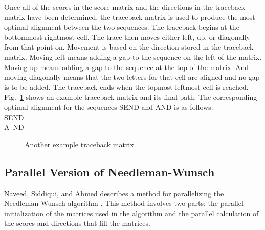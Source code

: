 \documentclass[conference]{IEEEtran}
\begin{document}
Once all of the scores in the score matrix and the directions in the traceback matrix have been determined, the traceback matrix is used to produce the most optimal alignment between the two sequences. The traceback begins at the bottommost rightmost cell. The trace then moves either left, up, or diagonally from that point on. Movement is based on the direction stored in the traceback matrix. Moving left means adding a gap to the sequence on the left of the matrix. Moving up means adding a gap to the sequence at the top of the matrix. And moving diagonally means that the two letters for that cell are aligned and no gap is to be added. The traceback ends when the topmost leftmost cell is reached. Fig.~\ref{7} shows an example traceback matrix and its final path. The corresponding optimal alignment for the sequences SEND and AND is as follows:\\
 
\hspace*{1em}SEND\\
\hspace*{2em}A–ND

\begin{figure}[htbp]
\centerline{}
\caption{Another example traceback matrix. \cite{vladimir}}
\label{7}
\end{figure}

\subsection{Parallel Version of Needleman-Wunsch}
Naveed, Siddiqui, and Ahmed describes a method for parallelizing the Needleman-Wunsch algorithm \cite{naveed_siddiqui_ahmed}. This method involves two parts: the parallel initialization of the matrices used in the algorithm and the parallel calculation of the scores and directions that fill the matrices.
\end{document}
